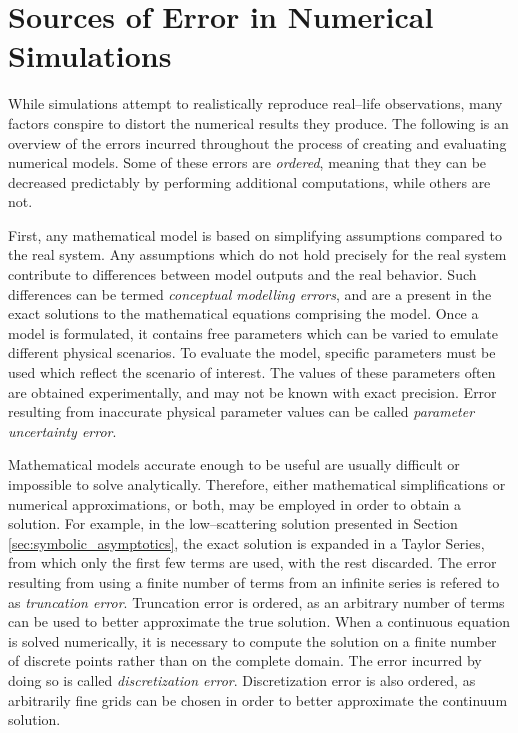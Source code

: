 \documentclass[ms,cpyr,lof,lot]{uathesis}
\begin{document}
\section{Sources of Error in Numerical Simulations}
While simulations attempt to realistically reproduce real--life observations, many factors conspire to distort the numerical results they produce.
The following is an overview of the errors incurred throughout the process of creating and evaluating numerical models.
Some of these errors are \textit{ordered}, meaning that they can be decreased predictably by performing additional computations, while others are not.

First, any mathematical model is based on simplifying assumptions compared to the real system.
Any assumptions which do not hold precisely for the real system contribute to differences between model outputs and the real behavior.
Such differences can be termed \textit{conceptual modelling errors}, and are a present in the exact solutions to the mathematical equations comprising the model.
Once a model is formulated, it contains free parameters which can be varied to emulate different physical scenarios.
To evaluate the model, specific parameters must be used which reflect the scenario of interest.
The values of these parameters often are obtained experimentally, and may not be known with exact precision.
Error resulting from inaccurate physical parameter values can be called \textit{parameter uncertainty error}.

Mathematical models accurate enough to be useful are usually difficult or impossible to solve analytically.
Therefore, either mathematical simplifications or numerical approximations, or both, may be employed in order to obtain a solution.
For example, in the low--scattering solution presented in Section \ref{sec:symbolic_asymptotics}, the exact solution is expanded in a Taylor Series, from which only the first few terms are used, with the rest discarded.
The error resulting from using a finite number of terms from an infinite series is refered to as \textit{truncation error}.
Truncation error is ordered, as an arbitrary number of terms can be used to better approximate the true solution.
When a continuous equation is solved numerically, it is necessary to compute the solution on a finite number of discrete points rather than on the complete domain.
The error incurred by doing so is called \textit{discretization error}.
Discretization error is also ordered, as arbitrarily fine grids can be chosen in order to better approximate the continuum solution.
\end{document}
